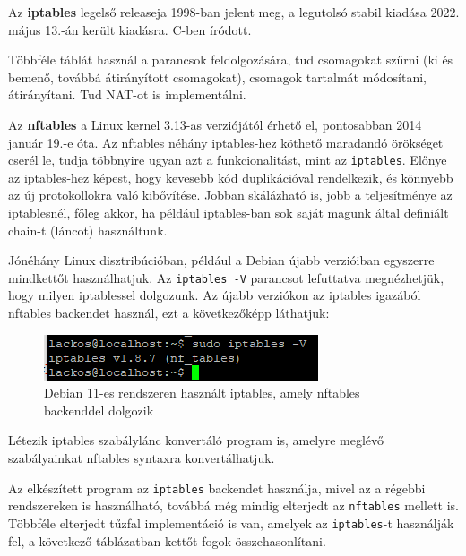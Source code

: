 Az \textbf{iptables} legelső releaseja 1998-ban jelent meg, a legutolsó stabil kiadása 2022. május 13.-án került kiadásra. C-ben íródott. \cite{iptables}

\pagebreak

Többféle táblát használ a parancsok feldolgozására, tud csomagokat szűrni (ki és bemenő, továbbá átirányított csomagokat), csomagok tartalmát módosítani, átirányítani. Tud NAT-ot is implementálni. \cite{iptables_man}

Az \textbf{nftables} a Linux kernel 3.13-as verziójától érhető el, pontosabban 2014 január 19.-e óta. Az nftables néhány iptables-hez köthető maradandó örökséget cserél le, tudja többnyire ugyan azt a funkcionalitást, mint az \texttt{iptables}. Előnye az iptables-hez képest, hogy kevesebb kód duplikációval rendelkezik, és könnyebb az új protokollokra való kibővítése. \cite{nftables}
Jobban skálázható is, jobb a teljesítménye az iptablesnél, főleg akkor, ha például iptables-ban sok saját magunk által definiált chain-t (láncot) használtunk.

Jónéhány Linux disztribúcióban, például a Debian újabb verzióiban egyszerre mindkettőt használhatjuk. Az \texttt{iptables -V} parancsot lefuttatva megnézhetjük, hogy milyen iptablessel dolgozunk. Az újabb verziókon az iptables igazából nftables backendet használ, ezt a következőképp láthatjuk:
\begin{figure}[h]
\centering
\includegraphics[scale=1.0]{images/iptables_nftables.png}
\caption{Debian 11-es rendszeren használt iptables, amely nftables backenddel dolgozik}
\end{figure}

Létezik iptables szabálylánc konvertáló program is, amelyre meglévő szabályainkat nftables syntaxra konvertálhatjuk. 

Az elkészített program az \texttt{iptables} backendet használja, mivel az a régebbi rendszereken is használható, továbbá még mindig elterjedt az \texttt{nftables} mellett is. Többféle elterjedt tűzfal implementáció is van, amelyek az \texttt{iptables}-t használják fel, a következő táblázatban kettőt fogok összehasonlítani.

